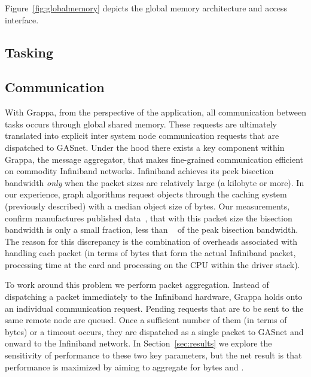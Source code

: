 
Figure~\ref{fig:globalmemory} depicts the global memory architecture and access interface.

\subsection{Tasking}

\subsection{Communication}

With Grappa, from the perspective of the application, all communication between tasks occurs through global shared memory.  These requests are ultimately translated into explicit inter system node communication requests that are dispatched to GASnet.  Under the hood there exists a key component within Grappa, the message aggregator, that makes fine-grained communication efficient on commodity Infiniband networks.  Infiniband achieves its peek bisection bandwidth \emph{only} when the packet sizes are relatively large (a kilobyte or more).  In our experience, graph algorithms request objects through the caching system (previously described) with a median object size of  bytes.  Our measurements, confirm manufactures published data~\cite{infinibandbandwidth}, that with this packet size the bisection bandwidth is only a small fraction, less than ~ of the peak bisection bandwidth.  The reason for this discrepancy is the combination of overheads associated with handling each packet (in terms of bytes that form the actual Infiniband packet, processing time at the card and processing on the CPU within the driver stack).

To work around this problem we perform packet aggregation.  Instead of dispatching a packet immediately to the Infiniband hardware, Grappa holds onto an individual communication request.  Pending requests that are to be sent to the same remote node are queued.  Once a sufficient number of them (in terms of bytes) or a timeout occurs, they are dispatched as a single packet to GASnet and onward to the Infiniband network.  In Section~\ref{sec:results} we explore the sensitivity of performance to these two key parameters, but the net result is that performance is maximized by aiming to aggregate for  bytes and .
